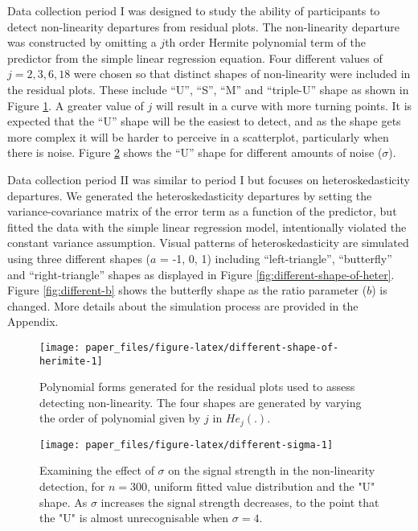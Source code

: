 \documentclass[]{interact}
\theoremstyle{plain}%
\theoremstyle{definition}
\theoremstyle{remark}
\begin{document}
Data collection period I was designed to study the ability of
participants to detect non-linearity departures from residual plots. The
non-linearity departure was constructed by omitting a \(j\)th order
Hermite polynomial
\citetext{\citealp{hermite1864nouveau}; \citealp[originally
by][]{de1820theorie}} term of the predictor from the simple linear
regression equation. Four different values of \(j = 2, 3, 6, 18\) were
chosen so that distinct shapes of non-linearity were included in the
residual plots. These include ``U'', ``S'', ``M'' and ``triple-U'' shape
as shown in Figure \ref{fig:different-shape-of-herimite}. A greater
value of \(j\) will result in a curve with more turning points. It is
expected that the ``U'' shape will be the easiest to detect, and as the
shape gets more complex it will be harder to perceive in a scatterplot,
particularly when there is noise. Figure \ref{fig:different-sigma} shows
the ``U'' shape for different amounts of noise (\(\sigma\)).

Data collection period II was similar to period I but focuses on
heteroskedasticity departures. We generated the heteroskedasticity
departures by setting the variance-covariance matrix of the error term
as a function of the predictor, but fitted the data with the simple
linear regression model, intentionally violated the constant variance
assumption. Visual patterns of heteroskedasticity are simulated using
three different shapes (\(a\) = -1, 0, 1) including ``left-triangle'',
``butterfly'' and ``right-triangle'' shapes as displayed in Figure
\ref{fig:different-shape-of-heter}. Figure \ref{fig:different-b} shows
the butterfly shape as the ratio parameter (\(b\)) is changed. More
details about the simulation process are provided in the Appendix.

\begin{figure}[!h]

{\centering \texttt{[image: paper\_files/figure-latex/different-shape-of-herimite-1]} 

}

\caption{Polynomial forms generated for the residual plots used to assess detecting non-linearity. The four shapes are generated by varying the order of polynomial given by $j$ in $He_j(.)$.}\label{fig:different-shape-of-herimite}
\end{figure}

\begin{figure}[!h]

{\centering \texttt{[image: paper\_files/figure-latex/different-sigma-1]} 

}

\caption{Examining the effect of $\sigma$ on the signal strength in the non-linearity detection, for $n=300$, uniform fitted value distribution and the "U" shape. As $\sigma$ increases the signal strength decreases, to the point that the "U" is almost unrecognisable when $\sigma=4$.}\label{fig:different-sigma}
\end{figure}
\end{document}
